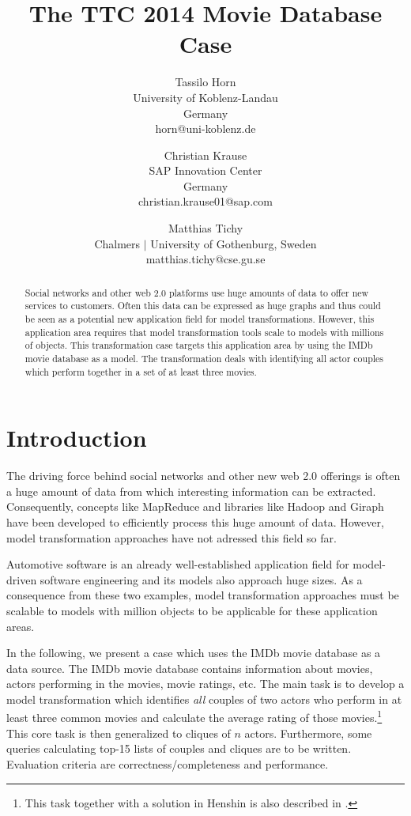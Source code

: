 \documentclass[a4paper,11pt]{article}
\title{The TTC 2014 Movie Database Case}
\author{
Tassilo Horn\\ University of Koblenz-Landau\\ Germany\\ horn@uni-koblenz.de
\and
Christian Krause\\ SAP Innovation Center\\ Germany\\ christian.krause01@sap.com
\and
Matthias Tichy\\ Chalmers $|$ University of Gothenburg, Sweden \\matthias.tichy@cse.gu.se
}
\begin{document}
\maketitle

\begin{abstract}
  Social networks and other web 2.0 platforms use huge amounts of data to offer
  new services to customers. Often this data can be expressed as huge graphs
  and thus could be seen as a potential new application field for model
  transformations. However, this application area requires that model
  transformation tools scale to models with millions of objects. This
  transformation case targets this application area by using the IMDb movie
  database as a model. The transformation deals with identifying all actor
  couples which perform together in a set of at least three movies.
  \end{abstract}
\vskip 32pt


\section{Introduction}

The driving force behind social networks and other new web 2.0 offerings is
often a huge amount of data from which interesting information can be
extracted.  Consequently, concepts like MapReduce \cite{Dean08} and libraries
like Hadoop \cite{Hadoop} and Giraph \cite{Giraph} have been developed to
efficiently process this huge amount of data. However, model transformation
approaches have not adressed this field so far.

Automotive software is an already well-established application field
for model-driven software engineering and its models also approach
huge sizes. As a consequence from these two examples, model
transformation approaches must be scalable to models with million
objects to be applicable for these application areas.

In the following, we present a case which uses the IMDb movie database
\cite{IMDBDATA} as a data source. The IMDb movie database contains information
about movies, actors performing in the movies, movie ratings, etc. The main
task is to develop a model transformation which identifies \emph{all} couples
of two actors who perform in at least three common movies and calculate the
average rating of those movies.\footnote{This task together with a solution in
  Henshin is also described in \cite{KTG14}.} This core task is then
generalized to cliques of \(n\) actors.  Furthermore, some queries calculating
top-15 lists of couples and cliques are to be written.  Evaluation criteria are
correctness/completeness and performance.
\end{document}
